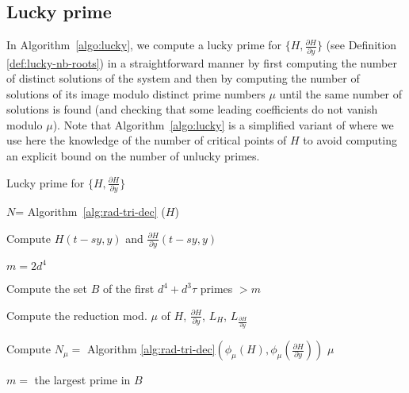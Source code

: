 \documentclass{sig-alternate}
\newcommand {\Z}   {\mathbb Z}
\newcommand{\blue}[1]{\color{blue}#1\color{black}\xspace}
\renewcommand{\blue}[1]{#1\xspace}
\begin{document}
\subsection{Lucky prime}

In Algorithm~\ref{algo:lucky}, we compute a lucky prime for $\{ H,\frac{\partial H}{\partial y} \}$ (see Definition
\ref{def:lucky-nb-roots}) in a straightforward manner by first computing the number of distinct
solutions of the system and then by computing the number of solutions
of its image modulo distinct prime numbers $\mu$ until the same number of solutions is found (and
checking that some leading coefficients do not vanish modulo $\mu$). Note that
Algorithm~\ref{algo:lucky} is a simplified variant of \blue{\cite[Algorithm 3]{bouzidiJSC2014a}} where we use here   the knowledge of the number of critical points of $H$
to avoid  computing an explicit bound on
the number of unlucky primes. 


\begin{algorithm}[t]
  \caption{Lucky prime for  $\{H,\frac{\partial H}{\partial y}\}$} 
\label{algo:lucky}
\begin{algorithmic}[1]

  \REQUIRE{ $H$ in $\Z[X,Y]$ such that $Lc_y(H) \in \Z$}


\STATE $N$= Algorithm~\ref{alg:rad-tri-dec} ($H$) \label{line-distinct}

\STATE Compute $H(t-sy,y)$ and $ \frac{\partial H}{\partial y}(t-sy,y)\quad $
\label{alg:nbrootZ1}

\STATE $m=2d^4$

 \label{alg:nbrootZ3}

\STATE Compute the set $B$ of the first $d^4+d^3\tau$ primes $>m$ 


\STATE Compute the reduction mod. $\mu$ of $H$, $\frac{\partial H}{\partial y}$, $L_H$,  $L_\frac{\partial
H}{\partial y}$\label{alg:nbrootZ6.1}

 \STATE Compute ${N}_\mu=$  Algorithm \ref{alg:rad-tri-dec}$(\phi_\mu(H),\phi_\mu(\frac{\partial H}{\partial y}))$\label{alg:nbrootZ5}
 \RETURN $\mu$
 \ENDIF
   \ENDIF
\ENDFOR
 
\STATE $m=$ the largest prime in $B$  

\ENDWHILE 

\end{algorithmic}
\end{algorithm}
\end{document}
